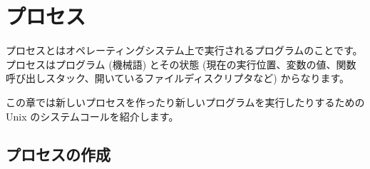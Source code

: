 %
%

\chapter{\label{sec/processes}プロセス}

プロセスとはオペレーティングシステム上で実行されるプログラムのことです。
プロセスはプログラム (機械語) とその状態 (現在の実行位置、変数の値、関数呼び出しスタック、開いているファイルディスクリプタなど)
からなります。

この章では新しいプロセスを作ったり新しいプログラムを実行したりするための Unix のシステムコールを紹介します。

\section{プロセスの作成}

